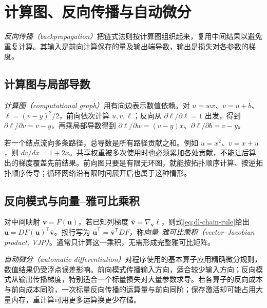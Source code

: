 \setcounter{chapter}{5} %
\chapter{计算图、反向传播与自动微分}
\label{chap:dl-backprop}
\emph{反向传播（backpropagation）}把链式法则按计算图组织起来，复用中间结果以避免重复计算。其输入是前向计算保存的量及输出端导数，输出是损失对各参数的梯度。

\section{计算图与局部导数}
\emph{计算图（computational graph）}用有向边表示数值依赖。对 $u=wx$、$v=u+b$、$\ell=(v-y)^2/2$，前向依次计算 $u,v,\ell$；反向从 $\partial\ell/\partial\ell=1$ 出发，得到 $\partial\ell/\partial v=v-y$，再乘局部导数得到 $\partial\ell/\partial w=(v-y)x$、$\partial\ell/\partial b=v-y$。

若一个结点流向多条路径，总导数是所有路径贡献之和。例如 $u=x^2$、$v=x+u$，则 $dv/dx=1+2x$。共享权重被多次使用时也必须累加各处贡献，不能让后算出的梯度覆盖先前结果。前向图只要是有限无环图，就能按拓扑顺序计算、按逆拓扑顺序传导；循环网络沿有限时间展开后也属于这种情形。

\section{反向模式与向量--雅可比乘积}
对中间映射 $\mathbf v=F(\mathbf u)$，若已知列梯度 $\overline{\mathbf v}=\nabla_{\mathbf v}\ell$，则式\eqref{eq:dl-chain-rule}给出 $\overline{\mathbf u}=DF(\mathbf u)^\mathsf T\overline{\mathbf v}$。按行写为 $\overline{\mathbf u}^\mathsf T=\overline{\mathbf v}^\mathsf TDF$，称\emph{向量--雅可比乘积（vector--Jacobian product, VJP）}。通常只计算这一乘积，无需形成完整雅可比矩阵。

\emph{自动微分（automatic differentiation）}对程序使用的基本算子应用精确微分规则，数值结果仍受浮点误差影响。前向模式传播输入方向，适合较少输入方向；反向模式从输出传播梯度，特别适合一个标量损失对大量参数求导。若各算子的反向成本与前向成本同阶，一次标量反向传播的运算量与前向同阶；保存激活却可能占用大量内存，重计算可用更多运算换更少存储。

